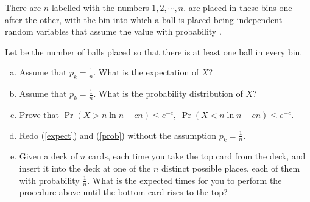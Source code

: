 
\begin{frame}{}

  \pause
  \begin{columns}
  \end{columns}
\end{frame}

\begin{frame}{}
  \begin{exampleblock}{}
    There are $n$  labelled with the numbers $1, 2, \cdots, n$.
     are placed in these bins one after the other,
    with the bin into which a ball is placed being independent random variables
    that assume the value  with probability .

    Let  be the number of balls placed so that there is at least one ball in every bin.
    \begin{enumerate}[(a)]
      \setlength{\itemsep}{5pt}
      \item \label{expect}
	Assume that $p_k = \frac{1}{n}$. What is the expectation of $X$?
      \item \label{prob}
	Assume that $p_k = \frac{1}{n}$. What is the probability distribution of $X$?
      \item Prove that $\Pr(X > n \ln n + cn) \le e^{-c},\; \Pr(X < n \ln n - cn) \le e^{-c}.$
      \item Redo (\ref{expect}) and (\ref{prob}) without the assumption $p_k = \frac{1}{n}$.
      \item Given a deck of $n$ cards, each time you take the top card from the deck,
	and insert it into the deck at one of the $n$ distinct possible places,
	each of them with probability $\frac{1}{n}$.
	What is the expected times for you to perform the procedure above until
	the bottom card rises to the top?
    \end{enumerate}
  \end{exampleblock}
\end{frame}

\begin{frame}{}
  \centerline{}

\end{frame}

